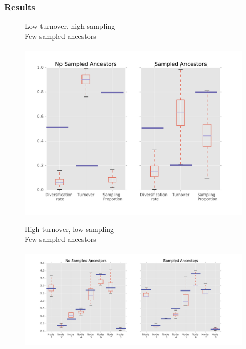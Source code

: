 \documentclass[]{beamer}
\begin{document}
\begin{frame}
\frametitle{Results}
\begin{center}
\begin{figure}
Low turnover, high sampling  \\
Few sampled ancestors \\
\lambda   \mu   \psi   \rho \\
\includegraphics[scale=0.4]{images/LowTurnHighSamplog.png}
\end{figure}
\end{center}
\end{frame}

\begin{frame}
\begin{center}
\begin{figure}
High turnover, low sampling  \\
Few sampled ancestors \\
\lambda   \mu   \psi   \rho \\
\includegraphics[scale=0.4]{images/HighTurnLowSampnodes.png}
\end{figure}
\end{center}
\end{frame}
\end{document}
